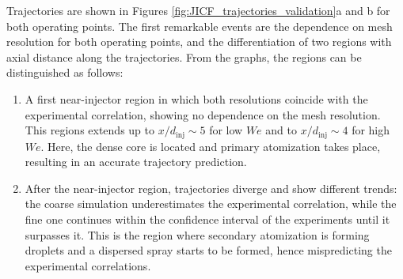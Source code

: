 Trajectories are shown in Figures \ref{fig:JICF_trajectories_validation}a and b for both operating points. The first remarkable events are the dependence on mesh resolution for both operating points, and the differentiation of two regions with axial distance along the trajectories. From the graphs, the regions can be distinguished as follows:

\begin{enumerate}

	\item A first near-injector region in which both resolutions coincide with the experimental correlation, showing no dependence on the mesh resolution. This regions extends up to $x/d_\mathrm{inj} \sim 5$ for low $We$ and to $x/d_\mathrm{inj} \sim 4$ for high $We$. Here, the dense core is located and primary atomization takes place, resulting in an accurate trajectory prediction.
	
	\item After the near-injector region, trajectories diverge and show different trends: the coarse simulation underestimates the experimental correlation, while the fine one continues within the confidence interval of the experiments until it surpasses it. This is the region where secondary atomization is forming droplets and a dispersed spray starts to be formed, hence mispredicting the experimental correlations.

\end{enumerate}

\clearpage



